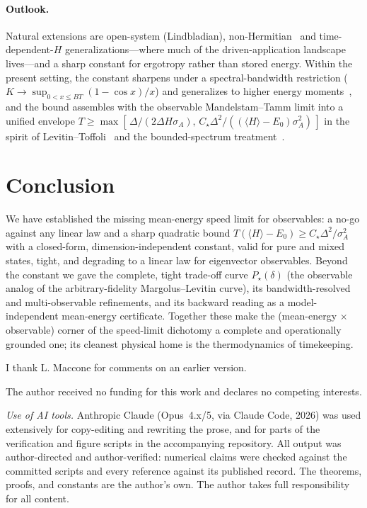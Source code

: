 \documentclass[aps,pra,twocolumn,superscriptaddress,nofootinbib,longbibliography]{revtex4-2}
\newcommand{\Ctrue}{C_{\star}}
\newcommand{\mean}[1]{\langle #1 \rangle}
\begin{document}
\paragraph{Outlook.}
Natural extensions are open-system (Lindbladian), non-Hermitian~\cite{Nishiyama2025speedlimits,wang2026general}
and time-dependent-$H$ generalizations---where much of the driven-application landscape lives---and a sharp
constant for ergotropy rather than stored energy. Within the
present setting, the constant sharpens under a spectral-bandwidth restriction
($K\to\sup_{0<x\le BT}(1-\cos x)/x$) and generalizes to higher energy moments~\cite{ChauZeng2024UnifyingQSL}, and the bound assembles with the
observable Mandelstam--Tamm limit into a unified envelope
$T\ge\max[\,\Delta/(2\Delta H\sigma_A),\,\Ctrue\Delta^2/((\mean H-E_0)\sigma_A^2)\,]$ in the spirit of
Levitin--Toffoli~\cite{LevitinToffoli2009} and the bounded-spectrum treatment~\cite{Ness2022BoundedSpectrumQSL}.

\section{Conclusion}
We have established the missing mean-energy speed limit for observables: a no-go against any linear law and a
sharp quadratic bound $T(\mean{H}-E_0)\ge\Ctrue\Delta^2/\sigma_A^2$ with a closed-form, dimension-independent
constant, valid for pure and mixed states, tight, and degrading to a linear law for eigenvector observables.
Beyond the constant we gave the complete, tight trade-off curve $P_\star(\delta)$ (the observable analog of the
arbitrary-fidelity Margolus--Levitin curve), its bandwidth-resolved and multi-observable refinements, and its
backward reading as a model-independent mean-energy certificate. Together these make the
(mean-energy $\times$ observable) corner of the speed-limit dichotomy a complete and operationally grounded
one; its cleanest physical home is the thermodynamics of timekeeping.

\begin{acknowledgments}
I thank L. Maccone for comments on an earlier version.

The author received no funding for this work and declares no competing interests.
\end{acknowledgments}

\medskip\noindent\emph{Use of AI tools.} Anthropic Claude (Opus~4.x/5, via Claude Code, 2026) was used
extensively for copy-editing and rewriting the prose, and for parts of the verification and figure scripts in
the accompanying repository. All output was author-directed and author-verified: numerical claims were checked
against the committed scripts and every reference against its published record. The theorems, proofs, and
constants are the author's own. The author takes full responsibility for all content.


\end{document}
